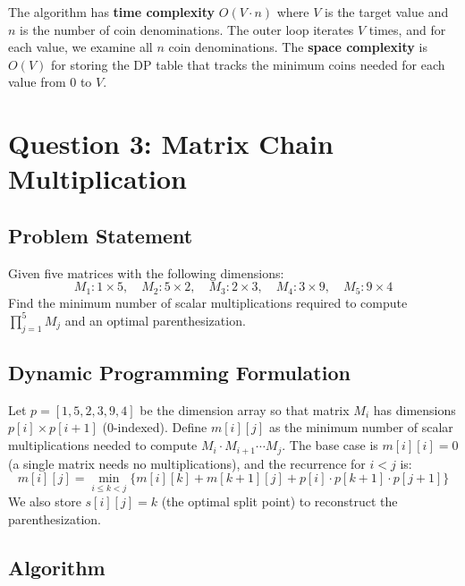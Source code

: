 \documentclass[12pt,a4paper]{article}
\begin{document}
The algorithm has \textbf{time complexity} $O(V \cdot n)$ where $V$ is the target value and $n$ is the number of coin denominations. The outer loop iterates $V$ times, and for each value, we examine all $n$ coin denominations. The \textbf{space complexity} is $O(V)$ for storing the DP table that tracks the minimum coins needed for each value from 0 to $V$.

\newpage

\section*{Question 3: Matrix Chain Multiplication}

\subsection*{Problem Statement}
Given five matrices with the following dimensions:
\[
    M_1: 1 \times 5, \quad M_2: 5 \times 2, \quad M_3: 2 \times 3, \quad M_4: 3 \times 9, \quad M_5: 9 \times 4
\]
Find the minimum number of scalar multiplications required to compute $\prod_{j=1}^{5} M_j$ and an optimal parenthesization.

\subsection*{Dynamic Programming Formulation}

Let $p = [1, 5, 2, 3, 9, 4]$ be the dimension array so that matrix $M_i$ has dimensions $p[i] \times p[i+1]$ (0-indexed). Define $m[i][j]$ as the minimum number of scalar multiplications needed to compute $M_i \cdot M_{i+1} \cdots M_j$. The base case is $m[i][i] = 0$ (a single matrix needs no multiplications), and the recurrence for $i < j$ is:
\[
    m[i][j] = \min_{i \le k < j} \Big\{ m[i][k] + m[k+1][j] + p[i] \cdot p[k+1] \cdot p[j+1] \Big\}
\]
We also store $s[i][j] = k$ (the optimal split point) to reconstruct the parenthesization.

\subsection*{Algorithm}
\end{document}
